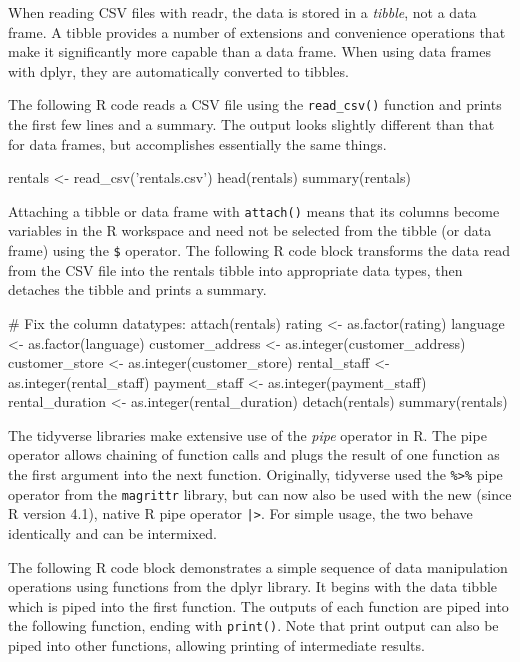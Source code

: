 When reading CSV files with readr, the data is stored in a \emph{tibble}, not a data frame. A tibble provides a number of extensions and convenience operations that make it significantly more capable than a data frame. When using data frames with dplyr, they are automatically converted to tibbles. 

The following R code reads a CSV file using the \texttt{read\_csv()} function and prints the first few lines and a summary. The output looks slightly different than that for data frames, but accomplishes essentially the same things.

\begin{samepage}
\begin{Rcode}
rentals <- read_csv('rentals.csv')
head(rentals)
summary(rentals)
\end{Rcode}
\end{samepage}

Attaching a tibble or data frame with \texttt{attach()} means that its columns become variables in the R workspace and need not be selected from the tibble (or data frame) using the \texttt{\$} operator. The following R code block transforms the data read from the CSV file into the rentals tibble into appropriate data types, then detaches the tibble and prints a summary.

\begin{samepage}
\begin{Rcode}
# Fix the column datatypes:
attach(rentals)
rating <- as.factor(rating)
language <- as.factor(language)
customer_address <- as.integer(customer_address)
customer_store <- as.integer(customer_store)
rental_staff <- as.integer(rental_staff)
payment_staff <- as.integer(payment_staff)
rental_duration <- as.integer(rental_duration)
detach(rentals)
summary(rentals)
\end{Rcode}
\end{samepage}

The tidyverse libraries make extensive use of the \emph{pipe} operator in R. The pipe operator allows chaining of function calls and plugs the result of one function as the first argument into the next function. Originally, tidyverse used the \texttt{\%>\%} pipe operator from the \texttt{magrittr} library, but can now also be used with the new (since R version 4.1), native R pipe operator \texttt{|>}. For simple usage, the two behave identically and can be intermixed. 

The following R code block demonstrates a simple sequence of data manipulation operations using functions from the dplyr library. It begins with the data tibble which is piped into the first function. The outputs of each function are piped into the following function, ending with \texttt{print()}. Note that print output can also be piped into other functions, allowing printing of intermediate results. 

